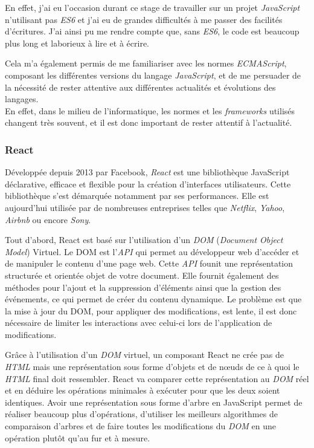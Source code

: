 \documentclass[12pt,a4paper]{article}
\begin{document}
  \bigskip

  En effet, j'ai eu l'occasion durant ce stage de travailler sur un projet
  \emph{JavaScript} n'utilisant pas \emph{ES6} et j'ai eu de grandes
  difficultés à me passer des facilités d'écritures. J'ai ainsi pu me
  rendre compte que, sans \emph{ES6}, le code est beaucoup plus long et
  laborieux à lire et à écrire.

  \bigskip

  Cela m'a également permis de me familiariser avec les normes
  \emph{ECMAScript}, composant les différentes versions du langage
  \emph{JavaScript}, et de me persuader de la nécessité de rester
  attentive aux différentes actualités et évolutions des langages.\\
  En effet, dans le milieu de l'informatique, les normes et les
  \emph{frameworks} utilisés changent très souvent, et il est donc
  important de rester attentif à l'actualité.

  \bigskip

  \subsubsection{React}\label{react}

  \bigskip

  Développée depuis 2013 par Facebook, \emph{React} est une bibliothèque
  JavaScript déclarative, efficace et flexible pour la création
  d'interfaces utilisateurs. Cette bibliothèque s'est démarquée notamment
  par ses performances. Elle est aujourd'hui utilisée par de nombreuses
  entreprises telles que \emph{Netflix}, \emph{Yahoo}, \emph{Airbnb} ou
  encore \emph{Sony}.

  \bigskip

  Tout d'abord, React est basé sur l'utilisation d'un \emph{DOM}
  (\emph{Document Object Model}) Virtuel. Le DOM est l'\emph{API} qui
  permet au développeur web d'accéder et de manipuler le contenu d'une
  page web. Cette \emph{API} founit une représentation structurée et
  orientée objet de votre document. Elle fournit également des méthodes
  pour l'ajout et la suppression d'éléments ainsi que la gestion des
  événements, ce qui permet de créer du contenu dynamique. Le problème est
  que la mise à jour du DOM, pour appliquer des modifications, est lente,
  il est donc nécessaire de limiter les interactions avec celui-ci lors de
  l'application de modifications. \bigskip

  Grâce à l'utilisation d'un \emph{DOM} virtuel, un composant React ne
  crée pas de \emph{HTML} mais une représentation sous forme d'objets et
  de nœuds de ce à quoi le \emph{HTML} final doit ressembler. React va
  comparer cette représentation au \emph{DOM} réel et en déduire les
  opérations minimales à exécuter pour que les deux soient identiques.
  Avoir une représentation sous forme d'arbre en JavaScript permet de
  réaliser beaucoup plus d'opérations, d'utiliser les meilleurs
  algorithmes de comparaison d'arbres et de faire toutes les modifications
  du \emph{DOM} en une opération plutôt qu'au fur et à mesure.
\end{document}
